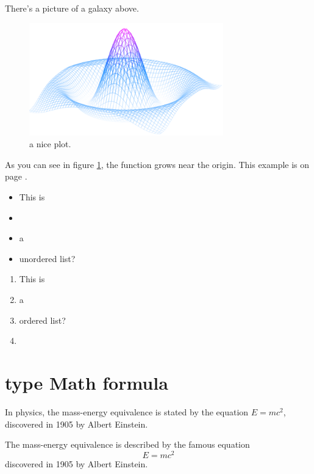 \documentclass[12pt, letterpaper]{article}
\begin{document}
There's a picture of a galaxy above.

\begin{figure}[h]
    \centering
    \includegraphics[width=0.75\textwidth]{mesh}
    \caption{a nice plot.}
    \label{fig:mesh1}
\end{figure}
As you can see in figure \ref{fig:mesh1}, the function grows near the origin. This example is on page \pageref{fig:mesh1}.

\begin{itemize}
    \item This is 
    \item 
    \item a
    \item unordered list?
\end{itemize}

\begin{enumerate}
    \item This is 
    \item a
    \item ordered list?
    \item 
\end{enumerate}

\section{type Math formula}

In physics, the mass-energy equivalence is stated 
by the equation $E=mc^2$, discovered in 1905 by Albert Einstein.    


The mass-energy equivalence is described by the famous equation
\[ E=mc^2 \] discovered in 1905 by Albert Einstein. 
\end{document}
